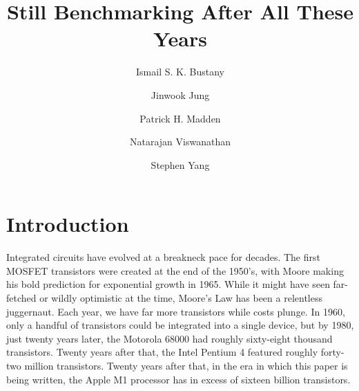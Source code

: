 \documentclass[sigconf]{acmart}
\begin{document}
\title{Still Benchmarking After All These Years}
\iffalse
\author{Blind Review}
\else
\author{Ismail S. K. Bustany}
\author{Jinwook Jung}
\author{Patrick H. Madden}
\author{Natarajan Viswanathan}
\author{Stephen Yang}


 
\fi
\begin{abstract}

\end{abstract}

\begin{CCSXML}
\end{CCSXML}



%


\maketitle

\section{Introduction}

Integrated circuits have evolved at a breakneck pace for decades.  The
first MOSFET transistors were created at the end of the 1950's, with 
Moore\cite{Moore650114} making his bold prediction for exponential growth
in 1965.  While it might have seen far-fetched or wildly optimistic
at the time, Moore's Law has been a relentless juggernaut.
Each year, we have far more
transistors while costs plunge.
In 1960, only a handful of transistors could be integrated into a single
device, but by 1980, just twenty years later, the Motorola 68000 had
roughly sixty-eight thousand transistors.  Twenty years after that,
the Intel Pentium 4
featured roughly forty-two million transistors.  Twenty years after that, in
the era in which this paper is being written, the Apple M1 processor has
in excess of sixteen billion transistors.
\end{document}
